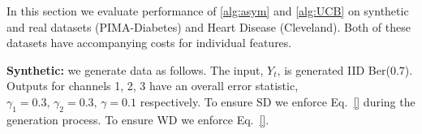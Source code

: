 


In this section we evaluate performance of \ref{alg:asym} and \ref{alg:UCB} on synthetic and real datasets (PIMA-Diabetes) and Heart Disease (Cleveland). Both of these datasets have accompanying costs for individual features.%

{\bf Synthetic:} we generate data as follows. The input, $Y_t$, is generated IID Ber($0.7$). Outputs for channels 1, 2, 3 have an overall error statistic, $\gamma_1 = 0.3,\,\gamma_2=0.3,\,\gamma=0.1$ respectively. To ensure SD we enforce Eq.~\ref{} during the generation process. To ensure WD we enforce Eq.~\ref{}.  %


